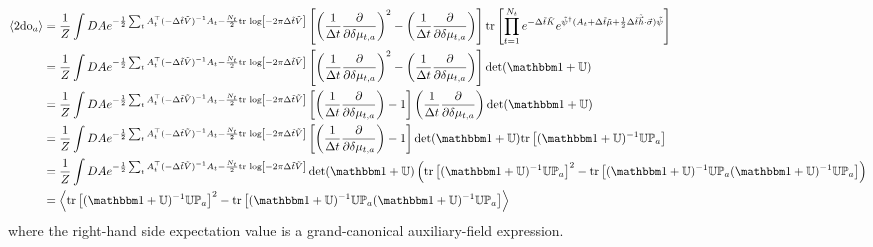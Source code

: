 \begin{align}
    \expectation{2\doubleOccupancy_a}
    &=
    \oneover{Z}\int DA e^{-\frac{1}{2} \sum_t A\transpose_t (-\Delta\tilde{t} \tilde{V})\inverse A_t - \frac{N_t}{2} \trlog{ -2\pi \Delta\tilde{t}\tilde{V}}}
    \left[\left(\oneover{\Delta t}\frac{\partial}{\partial \delta\mu_{t,a}}\right)^2 - \left(\oneover{\Delta t}\frac{\partial}{\partial \delta\mu_{t,a}}\right)\right]\tr{\prod_{t=1}^{N_t} e^{-\Delta \tilde{t}\tilde{K}}  e^{ \tilde{\psi}\adjoint (A_t + \Delta\tilde{t} \tilde{\mu} + \half \Delta\tilde{t} \tilde{\vec{h}}\cdot\vec{\sigma})\tilde{\psi}}}
    \nonumber\\
    &=
    \oneover{Z}\int DA e^{-\frac{1}{2} \sum_t A\transpose_t (-\Delta\tilde{t} \tilde{V})\inverse A_t - \frac{N_t}{2} \trlog{ -2\pi \Delta\tilde{t}\tilde{V}}}
    \left[\left(\oneover{\Delta t}\frac{\partial}{\partial \delta\mu_{t,a}}\right)^2 - \left(\oneover{\Delta t}\frac{\partial}{\partial \delta\mu_{t,a}}\right)\right] \det(\one + \UU)
    \nonumber\\
    &=
    \oneover{Z}\int DA e^{-\frac{1}{2} \sum_t A\transpose_t (-\Delta\tilde{t} \tilde{V})\inverse A_t - \frac{N_t}{2} \trlog{ -2\pi \Delta\tilde{t}\tilde{V}}}
    \left[\left(\oneover{\Delta t}\frac{\partial}{\partial \delta\mu_{t,a}}\right) - 1 \right] \left(\oneover{\Delta t}\frac{\partial}{\partial \delta\mu_{t,a}}\right) \det(\one + \UU)
    \nonumber\\
    &=
    \oneover{Z}\int DA e^{-\frac{1}{2} \sum_t A\transpose_t (-\Delta\tilde{t} \tilde{V})\inverse A_t - \frac{N_t}{2} \trlog{ -2\pi \Delta\tilde{t}\tilde{V}}}
    \left[\left(\oneover{\Delta t}\frac{\partial}{\partial \delta\mu_{t,a}}\right) - 1 \right] \det(\one + \UU) \tr{(\one + \UU)\inverse \UU \PP_a}
    \nonumber\\
    &=
    \oneover{Z}\int DA e^{-\frac{1}{2} \sum_t A\transpose_t (-\Delta\tilde{t} \tilde{V})\inverse A_t - \frac{N_t}{2} \trlog{ -2\pi \Delta\tilde{t}\tilde{V}}}
    \det( \one+\UU ) \left(\tr{(\one + \UU)\inverse \UU \PP_a}^2 - \tr{(\one+\UU)\inverse \UU \PP_a (\one+\UU)\inverse \UU \PP_a}\right)
    \nonumber\\
    &=
    \expectation{\tr{(\one + \UU)\inverse \UU \PP_a}^2 - \tr{(\one+\UU)\inverse \UU \PP_a (\one+\UU)\inverse \UU \PP_a}}
\end{align}
where the right-hand side expectation value is a grand-canonical auxiliary-field expression.
